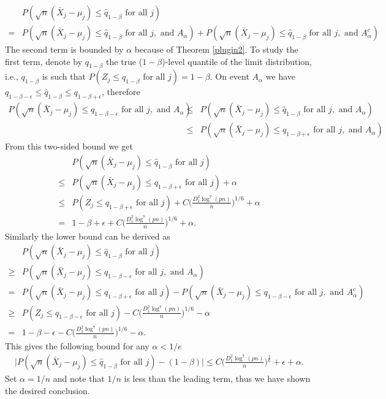 \documentclass[mnsc,blindrev]{informs4} %
\begin{document}
\begin{align*}
& P(\sqrt n(\bar{X}_j-\mu_j)\leq \hat q_{1-\beta}\text{ for all }j)\\
=&P(\sqrt n(\bar{X}_j-\mu_j)\leq \hat q_{1-\beta}\text{ for all }j,\text{ and }A_{\alpha})+P(\sqrt n(\bar{X}_j-\mu_j)\leq \hat q_{1-\beta}\text{ for all }j,\text{ and }A^c_{\alpha})
\end{align*}
The second term is bounded by $\alpha$ because of Theorem \ref{plugin2}. To study the first term, denote by $q_{1-\beta}$ the true ($1-\beta$)-level quantile of the limit distribution, i.e., $q_{1-\beta}$ is such that $P(Z_j\leq  q_{1-\beta}\text{ for all }j)=1-\beta$. On event $A_{\alpha}$ we have $q_{1-\beta-\epsilon}\leq\hat q_{1-\beta} \leq q_{1-\beta+\epsilon}$, therefore
\begin{eqnarray*}
P(\sqrt n(\bar{X}_j-\mu_j)\leq q_{1-\beta-\epsilon}\text{ for all }j,\text{ and }A_{\alpha})&\leq& P(\sqrt n(\bar{X}_j-\mu_j)\leq \hat q_{1-\beta}\text{ for all }j,\text{ and }A_{\alpha})\\
&\leq&P(\sqrt n(\bar{X}_j-\mu_j)\leq q_{1-\beta+\epsilon}\text{ for all }j,\text{ and }A_{\alpha}).
\end{eqnarray*}
From this two-sided bound we get
\begin{align*}
& P(\sqrt n(\bar{X}_j-\mu_j)\leq \hat q_{1-\beta}\text{ for all }j)\\
\leq &P(\sqrt n(\bar{X}_j-\mu_j)\leq q_{1-\beta+\epsilon}\text{ for all }j)+\alpha\\
\leq &P(Z_j\leq q_{1-\beta+\epsilon}\text{ for all }j)+C\Big(\frac{D_1^2\log^7(pn)}{n}\Big)^{1/6}+\alpha\\
=&1-\beta+\epsilon+C\Big(\frac{D_1^2\log^7(pn)}{n}\Big)^{1/6}+\alpha.
\end{align*}
Similarly the lower bound can be derived as
\begin{align*}
& P(\sqrt n(\bar{X}_j-\mu_j)\leq \hat q_{1-\beta}\text{ for all }j)\\
\geq&P(\sqrt n(\bar{X}_j-\mu_j)\leq q_{1-\beta-\epsilon}\text{ for all }j,\text{ and }A_{\alpha})\\
= &P(\sqrt n(\bar{X}_j-\mu_j)\leq q_{1-\beta+\epsilon}\text{ for all }j)-P(\sqrt n(\bar{X}_j-\mu_j)\leq q_{1-\beta-\epsilon}\text{ for all }j,\text{ and }A^c_{\alpha})\\
\geq &P(Z_j\leq q_{1-\beta-\epsilon}\text{ for all }j)-C\Big(\frac{D_1^2\log^7(pn)}{n}\Big)^{1/6}-\alpha\\
=&1-\beta-\epsilon-C\Big(\frac{D_1^2\log^7(pn)}{n}\Big)^{1/6}-\alpha.
\end{align*}
This gives the following bound for any $\alpha<1/e$
\begin{align*}
\lvert P(\sqrt n(\bar{X}_j-\mu_j)\leq \hat q_{1-\beta}\text{ for all }j)- (1-\beta)\rvert\leq C\Big(\frac{D_1^2\log^7(pn)}{n}\Big)^{\frac{1}{6}}+\epsilon+\alpha.
\end{align*}
Set $\alpha=1/n$ and note that $1/n$ is less than the leading term, thus we have shown the desired conclusion.\hfill\Halmos
\end{document}
